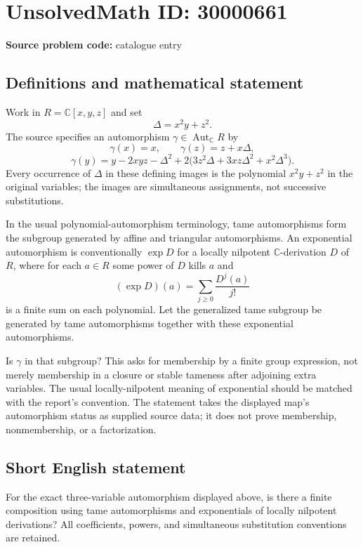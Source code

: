 \documentclass[11pt]{article}
\newcommand{\C}{\mathbb{C}}
\begin{document}
\section*{UnsolvedMath ID: 30000661}
\textbf{Source problem code:} catalogue entry
\subsection{Definitions and mathematical statement}
Work in $R=\C[x,y,z]$ and set
\[
 \Delta=x^2y+z^2.
\]
The source specifies an automorphism $\gamma\in\operatorname{Aut}_{\C}R$ by
\[
 \gamma(x)=x,\qquad \gamma(z)=z+x\Delta,
\]
\[
 \gamma(y)=y-2xyz-\Delta^2
       +2\bigl(3z^2\Delta+3xz\Delta^2+x^2\Delta^3\bigr).
\]
Every occurrence of $\Delta$ in these defining images is the polynomial $x^2y+z^2$ in the original variables; the images are simultaneous assignments, not successive substitutions.

In the usual polynomial-automorphism terminology, tame automorphisms form the subgroup generated by affine and triangular automorphisms. An exponential automorphism is conventionally $\exp D$ for a locally nilpotent $\C$-derivation $D$ of $R$, where for each $a\in R$ some power of $D$ kills $a$ and
\[
 (\exp D)(a)=\sum_{j\ge0}\frac{D^j(a)}{j!}
\]
is a finite sum on each polynomial. Let the generalized tame subgroup be generated by tame automorphisms together with these exponential automorphisms.

Is $\gamma$ in that subgroup? This asks for membership by a finite group expression, not merely membership in a closure or stable tameness after adjoining extra variables. The usual locally-nilpotent meaning of exponential should be matched with the report's convention. The statement takes the displayed map's automorphism status as supplied source data; it does not prove membership, nonmembership, or a factorization.
\subsection{Short English statement}
For the exact three-variable automorphism displayed above, is there a finite composition using tame automorphisms and exponentials of locally nilpotent derivations? All coefficients, powers, and simultaneous substitution conventions are retained.
\end{document}
